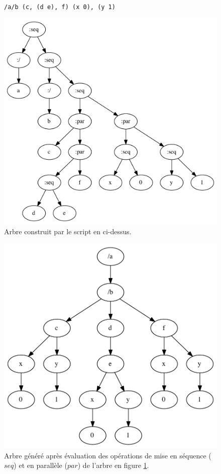 \documentclass{article}
\newcommand{\code}	[2][0.9]		{\vspace{0mm}\begin{center}\colorbox{mygrey}{
							\begin{minipage}[t]{#1\columnwidth} 
							{\small \texttt{#2}}
							\end{minipage}}\end{center}}
\begin{document}
\begin{figure}[htbp]
\code{/a/b (c, (d e), f) (x 0), (y 1)}
\begin{center}
\includegraphics[width=1.\columnwidth]{parse/sample1}
\caption{Arbre construit par le script en ci-dessus.}
\label{parsesample1}
\end{center}
\end{figure}

\begin{figure}[htbp]
\begin{center}
\includegraphics[width=0.9\columnwidth]{eval/sample1}
\caption{Arbre généré après évaluation des opérations de mise en séquence ($seq$) et en parallèle ($par$) de l'arbre en figure \ref{parsesample1}.}
\label{treesample1}
\end{center}
\end{figure}
\end{document}
